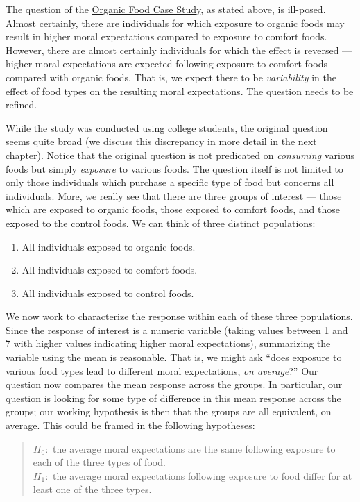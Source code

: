 \documentclass[]{book}
\providecommand{\tightlist}{%
  \setlength{\itemsep}{0pt}\setlength{\parskip}{0pt}}
\theoremstyle{plain}
\theoremstyle{mydefn}
\theoremstyle{myexmpl}
\theoremstyle{remark}
\begin{document}
The question of the \protect\hyperlink{CaseOrganic}{Organic Food Case
Study}, as stated above, is ill-posed. Almost certainly, there are
individuals for which exposure to organic foods may result in higher
moral expectations compared to exposure to comfort foods. However, there
are almost certainly individuals for which the effect is reversed ---
higher moral expectations are expected following exposure to comfort
foods compared with organic foods. That is, we expect there to be
\emph{variability} in the effect of food types on the resulting moral
expectations. The question needs to be refined.

While the study was conducted using college students, the original
question seems quite broad (we discuss this discrepancy in more detail
in the next chapter). Notice that the original question is not
predicated on \emph{consuming} various foods but simply \emph{exposure}
to various foods. The question itself is not limited to only those
individuals which purchase a specific type of food but concerns all
individuals. More, we really see that there are three groups of interest
--- those which are exposed to organic foods, those exposed to comfort
foods, and those exposed to the control foods. We can think of three
distinct populations:

\begin{enumerate}
\def\labelenumi{\arabic{enumi}.}
\tightlist
\item
  All individuals exposed to organic foods.
\item
  All individuals exposed to comfort foods.
\item
  All individuals exposed to control foods.
\end{enumerate}

We now work to characterize the response within each of these three
populations. Since the response of interest is a numeric variable
(taking values between 1 and 7 with higher values indicating higher
moral expectations), summarizing the variable using the mean is
reasonable. That is, we might ask ``does exposure to various food types
lead to different moral expectations, \emph{on average}?'' Our question
now compares the mean response across the groups. In particular, our
question is looking for some type of difference in this mean response
across the groups; our working hypothesis is then that the groups are
all equivalent, on average. This could be framed in the following
hypotheses:

\begin{quote}
\(H_0:\) the average moral expectations are the same following exposure
to each of the three types of food.\\
\(H_1:\) the average moral expectations following exposure to food
differ for at least one of the three types.
\end{quote}
\end{document}
